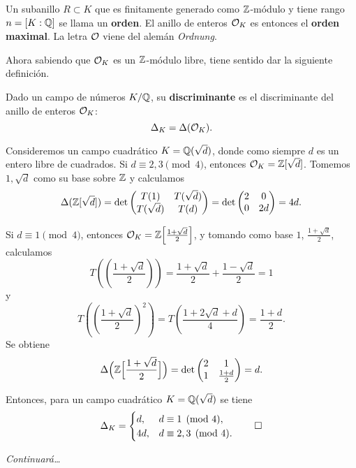 Un subanillo $R \subset K$ que es finitamente generado como $\mathbb{Z}$-módulo y tiene
rango $n = [K : \mathbb{Q}]$ se llama un \textbf{orden}. El anillo de enteros $\mathcal{O}_K$ es
entonces el \textbf{orden maximal}. La letra $\mathcal{O}$ viene del alemán
\emph{Ordnung}.

\vspace{1em}

Ahora sabiendo que $\mathcal{O}_K$ es un $\mathbb{Z}$-módulo libre, tiene sentido dar
la siguiente definición.

\begin{definicion}
  Dado un campo de números $K/\mathbb{Q}$, su \textbf{discriminante} es el
  discriminante del anillo de enteros $\mathcal{O}_K$:
  $$\Delta_K = \Delta (\mathcal{O}_K).$$
\end{definicion}

\begin{ejemplo}
  Consideremos un campo cuadrático $K = \mathbb{Q} (\sqrt{d})$, donde como siempre $d$
  es un entero libre de cuadrados. Si $d \equiv 2,3\pmod{4}$, entonces
  $\mathcal{O}_K = \mathbb{Z} [\sqrt{d}]$. Tomemos $1, \sqrt{d}$ como su base sobre
  $\mathbb{Z}$ y calculamos
  \[ \Delta (\mathbb{Z} [\sqrt{d}]) = \det \begin{pmatrix}
    T (1) & T (\sqrt{d}) \\
    T (\sqrt{d}) & T (d)
  \end{pmatrix} = \det \begin{pmatrix}
    2 & 0 \\
    0 & 2d
  \end{pmatrix} = 4d. \]

  Si $d \equiv 1 \pmod{4}$, entonces
  $\mathcal{O}_K = \mathbb{Z} \Bigl[\frac{1+\sqrt{d}}{2}\Bigr]$, y tomando como base
  $1$, $\frac{1+\sqrt{d}}{2}$, calculamos
  \[ T \left(\left(\frac{1+\sqrt{d}}{2}\right)\right) =
     \frac{1+\sqrt{d}}{2} + \frac{1-\sqrt{d}}{2} = 1 \]
  y
  \[ T \left(\left(\frac{1+\sqrt{d}}{2}\right)^2\right) =
     T \left(\frac{1 + 2\sqrt{d} + d}{4}\right) = \frac{1+d}{2}. \]
  Se obtiene
  \[ \Delta \Bigl(\mathbb{Z}\Bigl[\frac{1+\sqrt{d}}{2}\Bigr]\Bigr) =
  \det \begin{pmatrix}
    2 & 1 \\
    1 & \frac{1+d}{2}
  \end{pmatrix} = d. \]

  Entonces, para un campo cuadrático $K = \mathbb{Q} (\sqrt{d})$ se tiene
  \[ \Delta_K = \begin{cases}
    d, & d \equiv 1 \pmod{4}, \\
    4d, & d \equiv 2,3 \pmod{4}.
  \end{cases} \qedhere \]
\end{ejemplo}

\emph{Continuará\dots}
